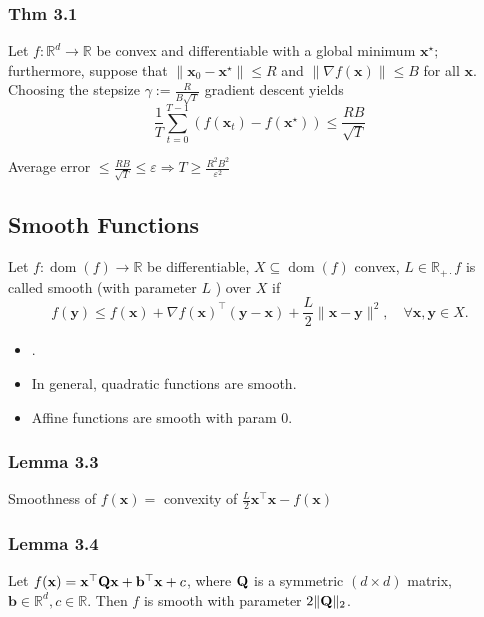 \subsubsection*{Thm 3.1}
Let $f: \mathbb{R}^{d} \rightarrow \mathbb{R}$ be convex and differentiable with a global minimum $\mathbf{x}^{\star} ;$ furthermore, suppose that $\left\|\mathbf{x}_{0}-\mathbf{x}^{\star}\right\| \leq R$ and $\|\nabla f(\mathbf{x})\| \leq B$ for all $\mathbf{x}$. Choosing the stepsize $\gamma:=\frac{R}{B \sqrt{T}}$
gradient descent yields
$$
\frac{1}{T} \sum_{t=0}^{T-1}\left(f\left(\mathbf{x}_{t}\right)-f\left(\mathbf{x}^{\star}\right)\right) \leq \frac{R B}{\sqrt{T}}
$$

Average error $\leq \frac{R B}{\sqrt{T}} \leq \varepsilon \Rightarrow T \geq \frac{R^{2} B^{2}}{\varepsilon^{2}}$

\subsection*{Smooth Functions}
Let $f: \operatorname{dom}(f) \rightarrow \mathbb{R}$ be differentiable, $X \subseteq \operatorname{dom}(f)$ convex, $L \in \mathbb{R}_{+\cdot} f$ is called smooth (with parameter $L$ ) over $X$ if
$$
f(\mathbf{y}) \leq f(\mathbf{x})+\nabla f(\mathbf{x})^{\top}(\mathbf{y}-\mathbf{x})+\frac{L}{2}\|\mathbf{x}-\mathbf{y}\|^{2}, \quad \forall \mathbf{x}, \mathbf{y} \in X .
$$

\begin{itemize}[leftmargin=*]
    \item {}.

    \item In general, quadratic functions are smooth.
    \item Affine functions are smooth with param $0$.
\end{itemize}


\subsubsection*{Lemma 3.3}
Smoothness of $f(\mathbf{x})=$ convexity of $\frac{L}{2} \mathbf{x}^{\top} \mathbf{x}-f(\mathbf{x})$

\subsubsection*{Lemma 3.4}
Let $f(\mathbf{x})=\mathbf{x}^{\top} \boldsymbol{\mathbf{Q}} \mathbf{x}+\mathbf{b}^{\top} \mathbf{x}+c$, where $\boldsymbol{\mathbf{Q}}$ is a symmetric $(d \times d)$ matrix, $\mathbf{b} \in \mathbb{R}^{d}, c \in \mathbb{R}$. Then $f$ is smooth with parameter $2\|\boldsymbol{\mathbf{Q}}\|_2$.

